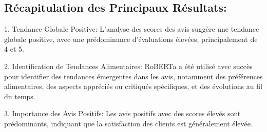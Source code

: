 \subsection{Récapitulation des Principaux Résultats:}

1. Tendance Globale Positive: L'analyse des scores des avis suggère une tendance globale positive, avec une prédominance d'évaluations élevées, principalement de 4 et 5.

2. Identification de Tendances Alimentaires: RoBERTa a été utilisé avec succès pour identifier des tendances émergentes dans les avis, notamment des préférences alimentaires, des aspects appréciés ou critiqués spécifiques, et des évolutions au fil du temps.

3. Importance des Avis Positifs: Les avis positifs avec des scores élevés sont prédominants, indiquant que la satisfaction des clients est généralement élevée.
